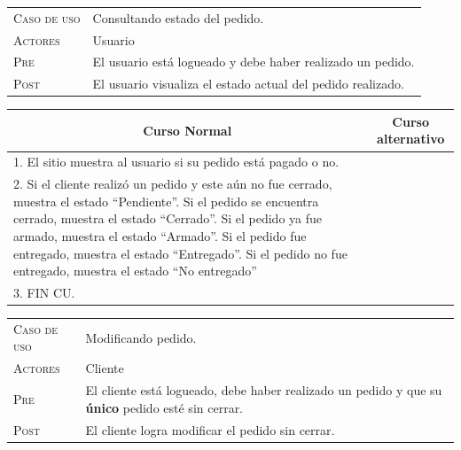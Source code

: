 \newpage

\begin{tabular}{p{} p{}}
    \textsc{Caso de uso} & Consultando estado del pedido. \\
    \textsc{Actores} & Usuario \\
    \textsc{Pre} & El usuario está logueado y debe haber realizado un pedido.
    \\
    \textsc{Post} & El usuario visualiza el estado actual del pedido realizado. \\
\end{tabular}

\begin{center}
\begin{tabular}{|p{}|p{}|}
    \hline
    \multicolumn{1}{|c|}{Curso Normal} &
    \multicolumn{1}{|c|}{Curso alternativo} \\
    \hline
    1. El sitio muestra al usuario si su pedido está pagado o no. & \\
	2. Si el cliente realizó un pedido y este aún no fue cerrado, muestra el estado ``Pendiente''. Si el pedido se encuentra cerrado, muestra el estado ``Cerrado''. Si el pedido ya fue armado, muestra el estado ``Armado''. Si el pedido fue entregado, muestra el estado ``Entregado''. Si el pedido no fue entregado, muestra el estado ``No entregado'' & \\
	3. FIN CU. & \\
    \hline
\end{tabular}
\end{center}

\begin{tabular}{p{} p{}}
    \textsc{Caso de uso} & Modificando pedido. \\
    \textsc{Actores} & Cliente \\
    \textsc{Pre} & El cliente está logueado, debe haber realizado un pedido y
    que su \textbf{único} pedido esté sin cerrar. \\
    \textsc{Post} & El cliente logra modificar el pedido sin cerrar.
    \\
\end{tabular}

